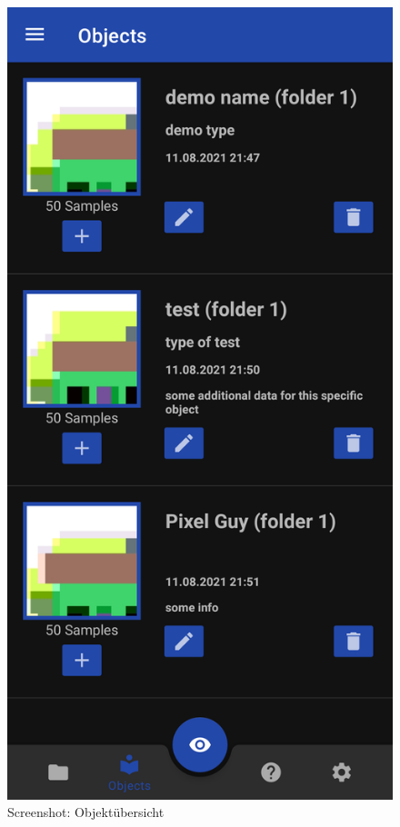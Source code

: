 \documentclass[oneside]{ausarbeitung}
\begin{document}
\begin{figure}[hptb]
	\centering
	\includegraphics[height=0.6\textheight]{images/screenshots/object-overview.png}
	\caption{Screenshot: Objektübersicht}
	\label{fig:screenshot:obj-overview}
\end{figure}
\end{document}
